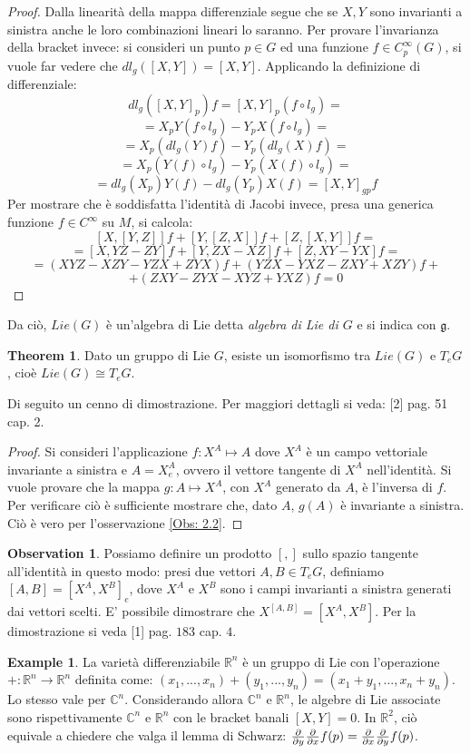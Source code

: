 \documentclass[12pt,a4paper]{report}
\theoremstyle{definition}
\theoremstyle{Theorem}
\newtheorem{Theo}[Def]{Theorem}
\theoremstyle{definition}
\newtheorem{Ex}[Def]{Example}
\theoremstyle{definition}
\newtheorem{Obs}[Def]{Observation}
\begin{document}
		\begin{proof}
			Dalla linearità della mappa differenziale segue che se $X,Y$ sono invarianti a sinistra anche le loro combinazioni lineari lo saranno.
			Per provare l'invarianza della bracket invece: si consideri un punto $p\in G$ ed una funzione $f\in C^\infty_p(G)$, si vuole far vedere che $dl_g([X,Y])=[X,Y]$.
			Applicando la definizione di differenziale: $$dl_g([X,Y]_p)f=[X,Y]_p(f\circ l_g)=$$$$=X_pY(f\circ l_g)-Y_pX(f\circ l_g)=$$$$=X_p(dl_g(Y)f)-Y_p(dl_g(X)f)=$$
			$$=X_p(Y(f)\circ l_g)-Y_p(X(f)\circ l_g)=$$
			$$=dl_g(X_p)Y(f)-dl_g(Y_p)X(f)=[X,Y]_{gp}f$$ 
			Per mostrare che è soddisfatta l'identità di Jacobi invece, presa una generica funzione $f\in C^\infty$ su $M$, si calcola:
			$$[X,[Y,Z]]f+[Y,[Z,X]]f+[Z,[X,Y]]f=$$
			$$=[X,YZ-ZY]f+[Y,ZX-XZ]f+[Z,XY-YX]f=$$
			$$=(XYZ-XZY-YZX+ZYX)f+(YZX-YXZ-ZXY+XZY)f+$$$$+(ZXY-ZYX-XYZ+YXZ)f=0$$
		\end{proof}
		Da ciò, $Lie(G)$ è un'algebra di Lie detta \textit{algebra di Lie di $G$} e si indica con $\mathfrak{g}$.
		\begin{Theo}
			Dato un gruppo di Lie $G$, esiste un isomorfismo tra $Lie(G)$ e $T_eG$, cioè $Lie(G)\cong T_eG$.
		\end{Theo}
		Di seguito un cenno di dimostrazione. Per maggiori dettagli si veda: [2] pag. 51 cap. 2.
		\begin{proof}
			Si consideri l'applicazione $f:X^A\mapsto A$ dove $X^A$ è un campo vettoriale invariante a sinistra e $A=X^A_e$, ovvero il vettore tangente di $X^A$ nell'identità.
			Si vuole provare che la mappa $g:A\mapsto X^A$, con $X^A$ generato da $A$, è l'inversa di $f$. Per verificare ciò è sufficiente mostrare che, dato $A$, $g(A)$ è invariante a sinistra. Ciò è vero per l'osservazione \ref{Obs: 2.2}.
		\end{proof}
		\begin{Obs}\label{Obs: bracket T}
			Possiamo definire un prodotto $[,]$ sullo spazio tangente all'identità in questo modo: presi due vettori $A,B\in T_eG$, definiamo $[A,B]=[X^A,X^B]_e$, dove $X^A$ e $X^B$ sono i campi invarianti a sinistra generati dai vettori scelti. E' possibile dimostrare che $X^{[A,B]}=[X^A,X^B]$. Per la dimostrazione si veda [1] pag. $183$ cap. $4$.
		\end{Obs}
		\begin{Ex}
			La varietà differenziabile $\mathbb{R}^n$ è un gruppo di Lie con l'operazione\\ $+:\mathbb{R}^n\rightarrow\mathbb{R}^n$ definita come: $(x_1,...,x_n)+(y_1,...,y_n)=(x_1+y_1,...,x_n+y_n)$. Lo stesso vale per $\mathbb{C}^n$.
			Considerando allora $\mathbb{C}^n$ e $\mathbb{R}^n$, le algebre di Lie associate sono rispettivamente $\mathbb{C}^n$ e $\mathbb{R}^n$ con le bracket banali $[X,Y]=0$. In $\mathbb{R}^2$, ciò equivale a chiedere che valga il lemma di Schwarz: ${\partial\over\partial y}{\partial\over\partial x}f(p)={\partial\over\partial x}{\partial\over\partial y}f(p)$.
		\end{Ex}
\end{document}
